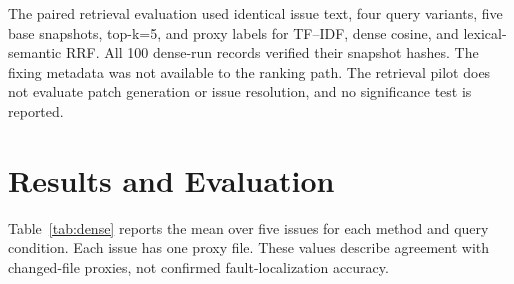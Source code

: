 \documentclass[3p,times,procedia]{elsarticle}
\begin{document}
The paired retrieval evaluation used identical issue text, four query variants, five base snapshots, top-k=5, and proxy labels for TF--IDF, dense cosine, and lexical-semantic RRF. All 100 dense-run records verified their snapshot hashes. The fixing metadata was not available to the ranking path. The retrieval pilot does not evaluate patch generation or issue resolution, and no significance test is reported.

\section{Results and Evaluation}
Table~\ref{tab:dense} reports the mean over five issues for each method and query condition. Each issue has one proxy file. These values describe agreement with changed-file proxies, not confirmed fault-localization accuracy.


\begin{table}[t]
\caption{Matched dense retrieval comparison, mean across five proxy-labeled issues.}
\label{tab:dense}
\centering
\small
{}
\end{table}
\end{document}
